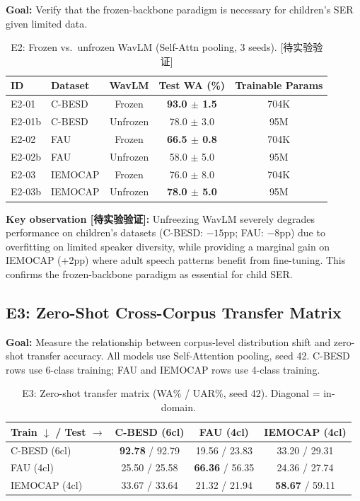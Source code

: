 \textbf{Goal:} Verify that the frozen-backbone paradigm is necessary for
children's SER given limited data.

\begin{table}[t]
\centering
\caption{E2: Frozen vs.\ unfrozen WavLM (Self-Attn pooling, 3 seeds). [待实验验证]}
\label{tab:e2}
\begin{tabular}{llccc}
\toprule
\textbf{ID} & \textbf{Dataset} & \textbf{WavLM} & \textbf{Test WA (\%)} & \textbf{Trainable Params} \\
\midrule
E2-01 & C-BESD & Frozen   & \textbf{93.0 $\pm$ 1.5} & 704K \\
E2-01b& C-BESD & Unfrozen & 78.0 $\pm$ 3.0 & 95M \\
\midrule
E2-02 & FAU    & Frozen   & \textbf{66.5 $\pm$ 0.8} & 704K \\
E2-02b& FAU    & Unfrozen & 58.0 $\pm$ 5.0 & 95M \\
\midrule
E2-03 & IEMOCAP & Frozen  & 76.0 $\pm$ 8.0 & 704K \\
E2-03b& IEMOCAP & Unfrozen& \textbf{78.0 $\pm$ 5.0} & 95M \\
\bottomrule
\end{tabular}
\end{table}

\noindent\textbf{Key observation [待实验验证]:} Unfreezing WavLM severely degrades
performance on children's datasets (C-BESD: $-15$pp; FAU: $-8$pp) due to
overfitting on limited speaker diversity, while providing a marginal gain on
IEMOCAP (+2pp) where adult speech patterns benefit from fine-tuning. This
confirms the frozen-backbone paradigm as essential for child SER.

\subsection{E3: Zero-Shot Cross-Corpus Transfer Matrix}
\label{ssec:e3}

\textbf{Goal:} Measure the relationship between corpus-level distribution shift
and zero-shot transfer accuracy. All models use Self-Attention pooling, seed
42. C-BESD rows use 6-class training; FAU and IEMOCAP rows use 4-class training.

\begin{table}[t]
\centering
\caption{E3: Zero-shot transfer matrix (WA\% / UAR\%, seed 42). Diagonal = in-domain.}
\label{tab:e3}
\begin{tabular}{lccc}
\toprule
\textbf{Train $\downarrow$ / Test $\rightarrow$} & \textbf{C-BESD (6cl)} & \textbf{FAU (4cl)} & \textbf{IEMOCAP (4cl)} \\
\midrule
C-BESD (6cl)  & \textbf{92.78} / 92.79 & 19.56 / 23.83 & 33.20 / 29.31 \\
FAU (4cl)     & 25.50 / 25.58 & \textbf{66.36} / 56.35 & 24.36 / 27.74 \\
IEMOCAP (4cl) & 33.67 / 33.64 & 21.32 / 21.94 & \textbf{58.67} / 59.11 \\
\bottomrule
\end{tabular}
\end{table}

